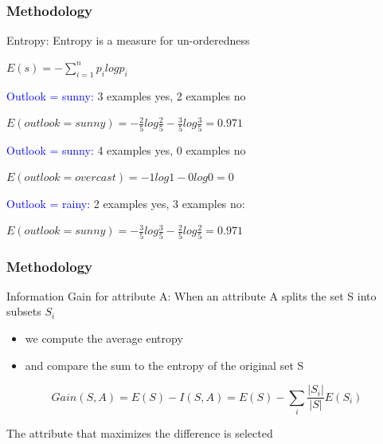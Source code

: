 \documentclass[xcolor={x11names,svgnames,dvipsnames}]{beamer}
\begin{document}
\begin{frame}
\frametitle{Methodology}
\begin{block}{Entropy:}
Entropy is a measure for un-orderedness\\
\begin{center}
$E(s)=-\sum_{i=1}^n p_i logp_i$
\end{center}
\textcolor{blue}{Outlook = sunny:} 3 examples yes, 2 examples no\\
\begin{center}
$E(outlook=sunny)=-\frac{2}{5}log{\frac{2}{5}}-\frac{3}{5}log{\frac{3}{5}}=0.971$
\end{center}

\textcolor{blue}{Outlook = sunny:}  4 examples yes, 0 examples no\\

\begin{center}
$E(outlook=overcast)=-1log{1}-0log{0}=0$
\end{center}
\textcolor{blue}{Outlook = rainy:} 2 examples yes, 3 examples no:\\
\begin{center}
$E(outlook=sunny)=-\frac{3}{5}log{\frac{3}{5}}-\frac{2}{5}log{\frac{2}{5}}=0.971$
\end{center}
\end{block}

\end{frame}

\begin{frame}
\frametitle{Methodology}
\begin{block}{Information Gain for attribute A:}
When an attribute A splits the set S into subsets $S_i$
\begin{itemize}
\item  we compute the average entropy
\item  and compare the sum to the entropy of the original set S
\end{itemize}
\begin{equation*}
Gain(S,A)=E(S)-I(S,A)=E(S)-\sum_{i}\frac{|S_i|}{|S|}E(S_i)
\end{equation*}

The attribute that maximizes the difference is selected
\end{block}

\end{frame}
\end{document}

